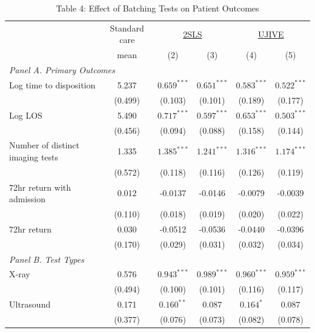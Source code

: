 \documentclass[11pt]{article}
\newcommand{\1}{\hbox{\rm 1\kern-.35em 1}}
\begin{document}
\begin{table}[t!]
\centering
\caption*{Table 4: Effect of Batching Tests on Patient Outcomes}

\begin{threeparttable}
\begin{tabular}{lccccc}
\toprule
& Standard care & \multicolumn{2}{c}{\underline{2SLS}} & \multicolumn{2}{c}{\underline{UJIVE}} \\
& mean & (2) & (3) & (4) & (5) \\
\midrule

\multicolumn{6}{l}{\textit{Panel A. Primary Outcomes}} \\[0.5em]

Log time to disposition 
& 5.237 
& $0.659^{***}$ & $0.651^{***}$
& $0.583^{***}$ & $0.522^{***}$ \\
& (0.499)
& (0.103) & (0.101)
& (0.189) & (0.177) \\[0.5em]

Log LOS
& 5.490
& $0.717^{***}$ & $0.597^{***}$
& $0.653^{***}$ & $0.503^{***}$ \\
& (0.456)
& (0.094) & (0.088)
& (0.158) & (0.144) \\[0.5em]

Number of distinct imaging tests 
& 1.335
& $1.385^{***}$ & $1.241^{***}$
& $1.316^{***}$ & $1.174^{***}$ \\
& (0.572)
& (0.118) & (0.116)
& (0.126) & (0.119) \\[0.5em]

72hr return with admission 
& 0.012
& -0.0137 & -0.0146
& -0.0079 & -0.0039 \\
& (0.110)
& (0.018) & (0.019)
& (0.020) & (0.022) \\[0.5em]

72hr return 
& 0.030
& -0.0512 & -0.0536
& -0.0440 & -0.0396 \\
& (0.170)
& (0.029) & (0.031)
& (0.032) & (0.034) \\[0.5em]


\multicolumn{6}{l}{\textit{Panel B. Test Types}} \\[0.5em]

X-ray 
& 0.576
& $0.943^{***}$ & $0.989^{***}$
& $0.960^{***}$ & $0.959^{***}$ \\
& (0.494)
& (0.100) & (0.101)
& (0.116) & (0.117) \\[0.5em]

Ultrasound 
& 0.171
& $0.160^{**}$ & $0.087$
& $0.164^{*}$ & $0.087$ \\
& (0.377)
& (0.076) & (0.073)
& (0.082) & (0.078) \\[0.5em]


\end{tabular}
\end{threeparttable}
\end{table}
\end{document}

